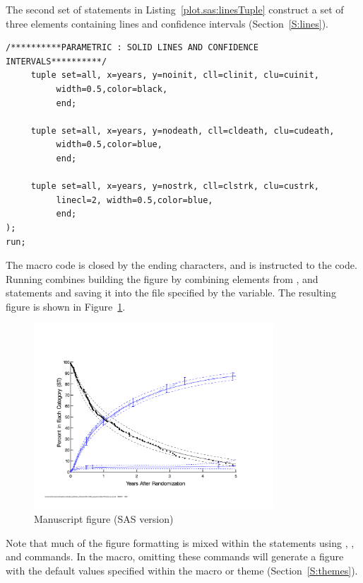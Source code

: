 \documentclass[nojss, letterpaper]{jss}\usepackage[]{graphicx}\usepackage[]{color}
\begin{document}
The second set of  statements in Listing~\ref{plot.sas:linesTuple} construct a set of three elements containing lines and confidence intervals (Section~\ref{S:lines}).
\begin{lstlisting}[float,floatplacement=!htpb, caption={plot.sas commands: lines tuple statements.}, label={plot.sas:linesTuple}]
     /**********PARAMETRIC : SOLID LINES AND CONFIDENCE INTERVALS**********/      
     tuple set=all, x=years, y=noinit, cll=clinit, clu=cuinit,
          width=0.5,color=black, 
          end;
     
     tuple set=all, x=years, y=nodeath, cll=cldeath, clu=cudeath,
          width=0.5,color=blue, 
          end;

     tuple set=all, x=years, y=nostrk, cll=clstrk, clu=custrk,
          linecl=2, width=0.5,color=blue, 
          end;
);
run;
\end{lstlisting}

The  macro code is closed by the ending \code{);} characters, and  is instructed to  the code. Running combines building the figure by combining elements from ,  and  statements and saving it into the file specified by the  variable. The resulting figure is shown in Figure~\ref{F:sasManuscript}.

\begin{figure}[!htpb]
\centering
\includegraphics[width=0.8\textwidth]{../inst/ceStatesST.pdf}
\caption{Manuscript figure (SAS version)}
\label{F:sasManuscript}
\end{figure}

Note that much of the figure formatting is mixed within the  statements using , ,  and  commands. In the  macro, omitting these commands will generate a figure with the default values specified within the  macro or  theme (Section~\ref{S:themes}).
\end{document}
